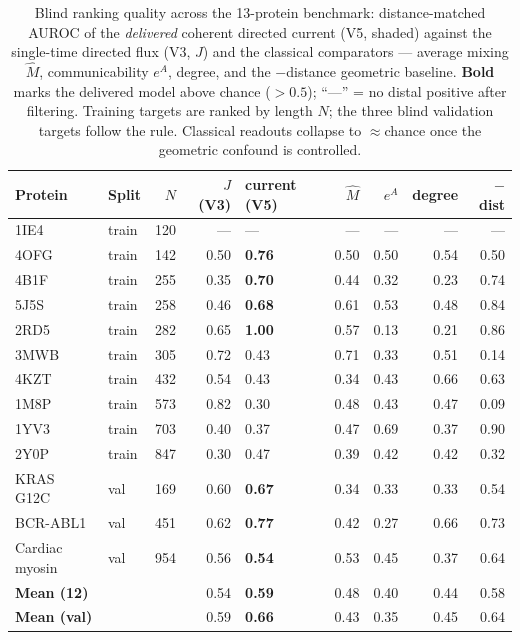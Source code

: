 \documentclass[10pt,a4paper]{article}
\newcommand{\B}[1]{\textbf{#1}}
\begin{document}
\begin{table}[h]
\centering
\caption{Blind ranking quality across the 13-protein benchmark: distance-matched AUROC of the
\emph{delivered} coherent directed current (V5, shaded) against the single-time directed flux (V3, $J$)
and the classical comparators --- average mixing $\hat M$, communicability $e^{A}$, degree, and the
$-$distance geometric baseline. \B{Bold} marks the delivered model above chance ($>0.5$); ``---'' = no
distal positive after filtering. Training targets are ranked by length $N$; the three blind validation
targets follow the rule. Classical readouts collapse to $\approx$chance once the geometric confound is
controlled.}
\label{tab:auc}
\footnotesize
\setlength{\tabcolsep}{5pt}\renewcommand{\arraystretch}{1.12}
\begin{tabular}{@{}llr r V r r r r@{}}
\toprule
\textbf{Protein} & \textbf{Split} & \textbf{$N$} & \textbf{$J$ (V3)} & \textbf{current (V5)} & \textbf{$\hat M$} & \textbf{$e^{A}$} & \textbf{degree} & \textbf{$-$dist}\\
\midrule
1IE4  & train & 120 & ---  & ---        & ---  & ---  & ---  & ---\\
4OFG  & train & 142 & 0.50 & \B{0.76}   & 0.50 & 0.50 & 0.54 & 0.50\\
4B1F  & train & 255 & 0.35 & \B{0.70}   & 0.44 & 0.32 & 0.23 & 0.74\\
5J5S  & train & 258 & 0.46 & \B{0.68}   & 0.61 & 0.53 & 0.48 & 0.84\\
2RD5  & train & 282 & 0.65 & \B{1.00}   & 0.57 & 0.13 & 0.21 & 0.86\\
3MWB  & train & 305 & 0.72 & 0.43       & 0.71 & 0.33 & 0.51 & 0.14\\
4KZT  & train & 432 & 0.54 & 0.43       & 0.34 & 0.43 & 0.66 & 0.63\\
1M8P  & train & 573 & 0.82 & 0.30       & 0.48 & 0.43 & 0.47 & 0.09\\
1YV3  & train & 703 & 0.40 & 0.37       & 0.47 & 0.69 & 0.37 & 0.90\\
2Y0P  & train & 847 & 0.30 & 0.47       & 0.39 & 0.42 & 0.42 & 0.32\\
\midrule
KRAS G12C      & val & 169 & 0.60 & \B{0.67} & 0.34 & 0.33 & 0.33 & 0.54\\
BCR-ABL1       & val & 451 & 0.62 & \B{0.77} & 0.42 & 0.27 & 0.66 & 0.73\\
Cardiac myosin & val & 954 & 0.56 & \B{0.54} & 0.53 & 0.45 & 0.37 & 0.64\\
\midrule
\textbf{Mean (12)} & & & 0.54 & \B{0.59} & 0.48 & 0.40 & 0.44 & 0.58\\
\textbf{Mean (val)} & & & 0.59 & \B{0.66} & 0.43 & 0.35 & 0.45 & 0.64\\
\bottomrule
\end{tabular}
\end{table}
\end{document}
